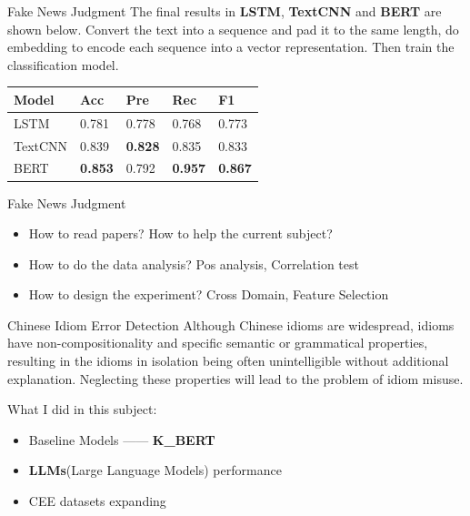 \documentclass[10pt]{beamer}
\begin{document}
\begin{frame}{Fake News Judgment}
The final results in \textbf{LSTM}, \textbf{TextCNN} and \textbf{BERT} are shown below. Convert the text into a sequence and pad it to the same length, do embedding to encode each sequence into a vector representation. Then train the classification model.
\begin{table}[]
	\centering
	\begin{tabular}{|l|l|l|l|l|}
		\hline
		\textbf{Model}   & \textbf{Acc}   & \textbf{Pre}   & \textbf{Rec}   & \textbf{F1}    \\ \hline
		LSTM    & 0.781 & 0.778 & 0.768 & 0.773 \\ \hline
		TextCNN & 0.839 & \textbf{0.828} & 0.835 & 0.833 \\ \hline
		BERT    & \textbf{0.853} & 0.792 & \textbf{0.957} & \textbf{0.867} \\ \hline
	\end{tabular}
	\label{tab:my-table}
\end{table}
\end{frame}

\begin{frame}{Fake News Judgment}
\begin{itemize}
    \item How to read papers? How to help the current subject?
    \item How to do the data analysis? Pos analysis, Correlation test
    \item How to design the experiment? Cross Domain, Feature Selection
\end{itemize}
\end{frame}

\begin{frame}[fragile]{Chinese Idiom Error Detection}
Although Chinese idioms are widespread, idioms have non-compositionality and specific semantic or grammatical
properties, resulting in the idioms in isolation being often unintelligible without additional explanation. Neglecting
these properties will lead to the problem of idiom misuse. 

What I did in this subject:
\begin{itemize}
    \item Baseline Models —— \textbf{K\_BERT}\cite{KBERT}
    \item \textbf{LLMs}(Large Language Models) performance
    \item CEE datasets expanding
\end{itemize}
\end{frame}
\end{document}

